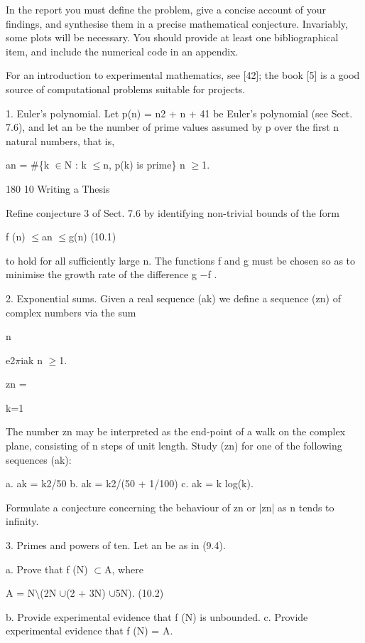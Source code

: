 \documentclass[11pt]{article}
\theoremstyle{plain}
\theoremstyle{definition}
\begin{document}
In the report you must define the problem, give a concise account of your findings, and synthesise them in a precise mathematical conjecture. Invariably, some plots will be necessary. You should provide at least one bibliographical item, and include the numerical code in an appendix.

For an introduction to experimental mathematics, see [42]; the book [5] is a good source of computational problems suitable for projects.

1. Euler's polynomial. Let p(n) = n2 + n + 41 be Euler's polynomial (see Sect. 7.6), and let an be the number of prime values assumed by p over the first n natural numbers, that is,

an = \#\{k $\in$N : k $\leq$n, p(k) is prime\} n $\geq$1.

180 10 Writing a Thesis

Refine conjecture 3 of Sect. 7.6 by identifying non-trivial bounds of the form

f (n) $\leq$an $\leq$g(n) (10.1)

to hold for all sufficiently large n. The functions f and g must be chosen so as to minimise the growth rate of the difference g $-$f .

2. Exponential sums. Given a real sequence (ak) we define a sequence (zn) of complex numbers via the sum

n

e2$\pi$iak n $\geq$1.

zn =

k=1

The number zn may be interpreted as the end-point of a walk on the complex plane, consisting of n steps of unit length. Study (zn) for one of the following sequences (ak):

a. ak = k2/50 b. ak = k2/(50 + 1/100) c. ak = k log(k).

Formulate a conjecture concerning the behaviour of zn or |zn| as n tends to infinity.

3. Primes and powers of ten. Let an be as in (9.4).

a. Prove that f (N) $\subset$A, where

A = N$\setminus$(2N $\cup$(2 + 3N) $\cup$5N). (10.2)

b. Provide experimental evidence that f (N) is unbounded. c. Provide experimental evidence that f (N) = A.
\end{document}
